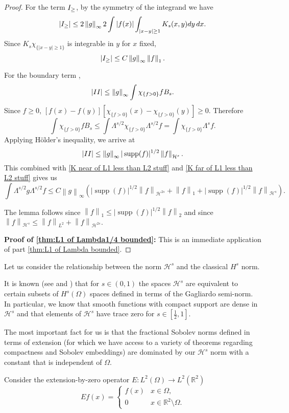 \documentclass[11pt]{amsart}
\theoremstyle{remark}
\theoremstyle{definition}
\newcommand{\R}{\mathbb{R}}
\newcommand{\norm}[1]{\left\lVert#1\right\rVert}
\newcommand{\paren}[1]{\left( #1 \right)}
\newcommand{\abs}[1]{\left\lvert #1 \right\rvert}
\DeclareMathOperator{\supp}{supp}
\newcommand{\indic}[1]{\chi_{\{#1\}}}
\newcommand{\HD}{\mathcal{H}}
\newcommand{\Rom}[1]{\MakeUppercase{\romannumeral #1}}
\begin{document}
\begin{proof}
For the term $\Rom{1}_\geq$, by the symmetry of the integrand we have
\[ \abs{\Rom{1}_\geq} \leq  2\norm{g}_\infty 2\int |f(x)| \int_{|x-y|\geq 1} K_s(x,y)dy \,dx. \]
Since $K_s \indic{|x-y|\geq 1}$ is integrable in $y$ for $x$ fixed,
\begin{equation} \label{K far of L1 less than L2 stuff}
\abs{\Rom{1}_\geq} \leq C \norm{g}_\infty \norm{f}_1.  
\end{equation}

For the boundary term \Rom{2}, 
\[ \abs{\Rom{2}} \leq \norm{g}_\infty \int\indic{f>0} f B_s. \]
Since $f \geq 0$, $[f(x)-f(y)][\indic{f > 0}(x) - \indic{f > 0}(y)] \geq 0$.  Therefore
\[ \int \indic{f > 0} f B_s \leq \int \Lambda^{s/2} \indic{f>0} \Lambda^{s/2} f = \int \indic{f>0} \Lambda^{s} f. \]
Applying H\"{o}lder's inequality, we arrive at
\[ \abs{\Rom{2}} \leq \norm{g}_\infty |\supp(f)|^{1/2} \norm{f}_{\HD^{s}}. \]
This combined with \eqref{K near of L1 less than L2 stuff} and \eqref{K far of L1 less than L2 stuff} gives us 
\[ \int \Lambda^{s/2} g \Lambda^{s/2} f \leq C \norm{g}_\infty \paren{|\supp(f)|^{1/2} \norm{f}_{\HD^{2s}} + \norm{f}_1 + |\supp(f)|^{1/2} \norm{f}_{\HD^s}}. \]

The lemma follows since $\norm{f}_1 \leq |\supp(f)|^{1/2} \norm{f}_2$ and since $\norm{f}_{\HD^s} \leq \norm{f}_{L^2} + \norm{f}_{\HD^{2s}}$.  

\textbf{Proof of \eqref{thm:L1 of Lambda1/4 bounded}:}
This is an immediate application of part \eqref{thm:L1 of Lambda bounded}.  

\end{proof}

Let us consider the relationship between the norm $\HD^s$ and the classical $H^s$ norm.  

It is known (see \cite{CoIg.sqg} and \cite{CaSt}) that for $s \in (0,1)$ the spaces $\HD^s$ are equivalent to certain subsets of $H^s(\Omega)$ spaces defined in terms of the Gagliardo semi-norm.  In particular, we know that smooth functions with compact support are dense in $\HD^s$ and that elements of $\HD^s$ have trace zero for $s \in [\frac{1}{2},1]$.  

The most important fact for us is that the fractional Sobolev norms defined in terms of extension (for which we have access to a variety of theorems regarding compactness and Sobolev embeddings) are dominated by our $\HD^s$ norm with a constant that is independent of $\Omega$.  

Consider the extension-by-zero operator $E:L^2(\Omega) \to L^2(\R^2)$
\[ E f (x) = \begin{cases} f(x) & x \in \Omega, \\ 0 & x \in \R^2 \setminus \Omega. \end{cases} \]
\end{document}
